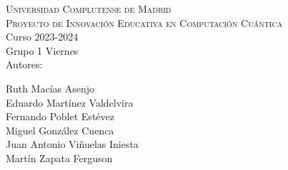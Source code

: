 \documentclass[11pt]{article}
\begin{document}
\begin{center}
            \textsc{Universidad Complutense de Madrid}\\
            \huge\textsc{Proyecto de Innovación Educativa en
Computación Cuántica}\\
            \LARGE Curso 2023-2024\\ \vspace{.2cm}
            \large Grupo 1 Viernes\\ \vspace{.2cm}
            \normalsize Autores:\\ \vspace{-0cm}
            \begin{multicols}{3}
             Ruth Macías Asenjo \\  Eduardo Martínez Valdelvira\\
             Fernando Poblet Estévez \\ Miguel González Cuenca\\
              Juan Antonio Viñuelas Iniesta \\ Martín Zapata Ferguson
            \end{multicols}
\end{center}
\end{document}

